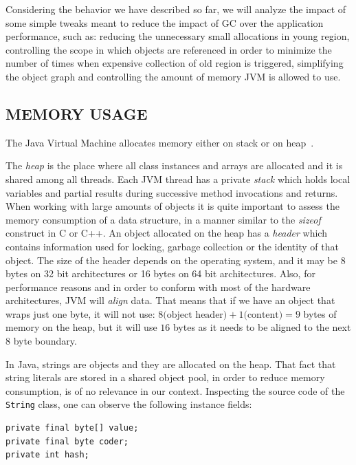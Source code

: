 \documentclass[a4paper,twoside]{article}
\begin{document}
Considering the behavior we have described so far, we will analyze the impact of some simple tweaks
meant to reduce the impact of GC over the application performance, such as:
reducing the unnecessary small allocations in young region, controlling the scope in which objects are referenced in
order to minimize the number of times when expensive collection of old region is triggered,
simplifying the object graph and controlling the amount of memory JVM is allowed to use.


\subsection{\uppercase{Memory Usage}}
\label{subsec:memory}

The Java Virtual Machine allocates memory either on stack or on heap~\cite{lindholm:2014}.

The {\textit{heap}} is the place where all class instances and arrays are allocated and it is shared among all threads.
Each JVM thread has a private {\textit{stack}} which holds local variables and partial results  during successive method invocations and returns.
When working with large amounts of objects it is quite important to assess the memory consumption of a data structure, in a manner similar to the {\textit{sizeof}} construct in C or C++.
An object allocated on the heap has a {\textit{header}} which contains information used for locking, garbage collection or the identity of that object.
The size of the header depends on the operating system, and it may be 8 bytes on 32 bit architectures or 16 bytes on 64 bit architectures.
Also, for performance reasons and in order to conform with most of the hardware architectures, JVM will {\textit{align}} data.
That means that if we have an object that wraps just one byte, it will not use: $8 \text{(object header)} + 1 \text{(content)} = 9 $ bytes of memory on the heap, but it will use $16$ bytes as it needs to be aligned to the next $8$ byte boundary.

In Java, strings are objects and they are allocated on the heap.
That fact that string literals are stored in a shared object pool, in order to reduce memory consumption, is of no relevance in our context.
Inspecting the source code of the \texttt{String} class, one can observe the following instance fields:
\begin{small}
\begin{verbatim}
private final byte[] value;
private final byte coder;
private int hash;
\end{verbatim}
\end{small}
\end{document}

